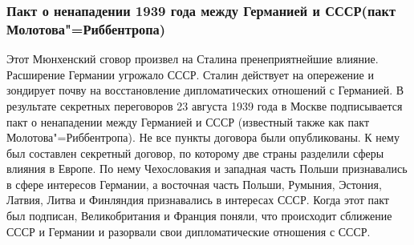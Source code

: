 \subsubsection{\textbf{Пакт о ненападении 1939 года между Германией и СССР(пакт Молотова"=Риббентропа)}}

Этот Мюнхенский сговор произвел на Сталина пренеприятнейшие влияние. Расширение Германии угрожало СССР. Сталин действует на опережение и зондирует почву на восстановление дипломатических отношений с Германией. В результате секретных переговоров 23 августа 1939 года в Москве подписывается пакт о ненападении между Германией и СССР (известный также как пакт Молотова"=Риббентропа). Не все пункты договора были опубликованы. К нему был составлен секретный договор, по которому две страны разделили сферы влияния в Европе. По нему Чехословакия и западная часть Польши признавались в сфере интересов Германии, а восточная часть Польши, Румыния, Эстония, Латвия, Литва и Финляндия признавались в интересах СССР. Когда этот пакт был подписан, Великобритания и Франция поняли, что происходит сближение СССР и Германии и разорвали свои дипломатические отношения с СССР.

